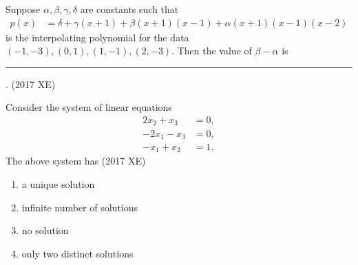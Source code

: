    \item Suppose $\alpha, \beta, \gamma, \delta$ are constants such that
    \begin{align*}
        p(x) &= \delta + \gamma(x+1) + \beta(x+1)(x-1) + \alpha(x+1)(x-1)(x-2)
    \end{align*}
    is the interpolating polynomial for the data $(-1,-3), (0,1), (1,-1), (2,-3)$.  
    Then the value of $\beta - \alpha$ is \rule{1cm}{0.01pt}.
    \hfill (2017 XE)
    \item Consider the system of linear equations
    \begin{align*}
        2x_2 + x_3 &= 0, \\
        -2x_1 - x_3 &= 0, \\
        -x_1 + x_2 &= 1.
    \end{align*}
    The above system has
    \hfill (2017 XE)
    \begin{multicols}{2}
    \begin{enumerate}
        \item a unique solution
        \item infinite number of solutions
        \item no solution
        \item only two distinct solutions
    \end{enumerate}
    \end{multicols}
